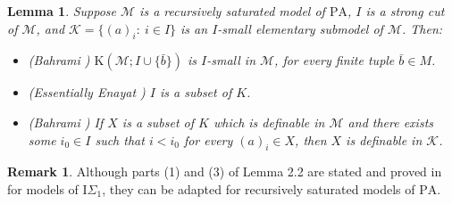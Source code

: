 \documentclass[11pt]{article}
\theoremstyle{plain}
\newtheorem{lem}[theorem]{Lemma}
\theoremstyle{definition}
\newtheorem{rem}{Remark}
\newcommand{\M}{\mathcal{M}}
\newcommand{\K}{\mathcal{K}}
\newcommand{\pa}{\mathrm{PA}}
\newcommand{\KK}{\mathrm{K}}
\begin{document}
\begin{lem}
	Suppose $\M$ is a recursively saturated model of $\pa$, $I$ is a strong cut of $\M$, and $\K=\{(a)_{i}: \ i\in I\}$ is an $I$-small elementary submodel of $\M$. Then:
	\begin{itemize}
		\item[(1)] \textup{(Bahrami \cite{me})}  $\KK(\M;I\cup\{\bar{b}\})$ is $I$-small in $\M$, for every finite tuple $\bar{b}\in M$.  
		\item[(2)] \textup{(Essentially Enayat \cite{ali})} $I$ is a subset of $K$.
		\item[(3)] \textup{(Bahrami \cite{me})} If $X$ is a subset of $K$ which is definable in $\M$ and there exists some $i_{0}\in I$ such that $i<i_{0}$ for every $(a)_{i}\in X$, then $X$ is definable in $\K$.
	\end{itemize}
\end{lem} 
\begin{rem}
Although parts (1) and (3) of Lemma 2.2 are stated and proved in \cite{me} for models of  $\mathrm{I}\Sigma_{1}$, they can be adapted for recursively saturated  models of  $\pa$. 
\end{rem}
\end{document}
